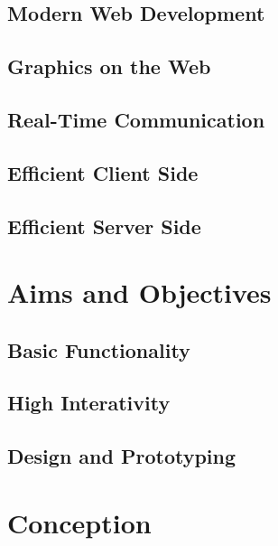 \documentclass[english, BCOR=6mm, twoside=true, open=right]{tudscrreprt}
\begin{document}
\section{Modern Web Development}

\section{Graphics on the Web}

\section{Real-Time Communication}

\section{Efficient Client Side}

\section{Efficient Server Side}



\chapter{Aims and Objectives}
\section{Basic Functionality}
\section{High Interativity}
\section{Design and Prototyping}


\chapter{Conception}
\end{document}
